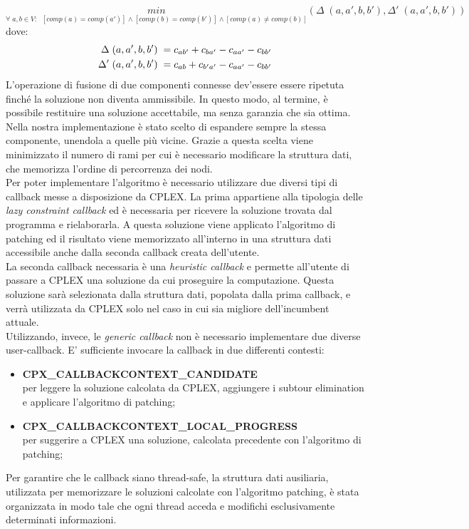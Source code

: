 $$\underset{\forall \; a,b \in V :\;\;[comp(a)=comp(a')] \wedge [comp(b)=comp(b')] \wedge [comp(a)\neq comp(b)]}{min}(\Delta \;(a, a',b, b'), \Delta' \;(a, a', b, b'))$$ dove:
\begin{align}
\Delta \;(a, a',b, b')\;=c_{ab'} + c_{ba'} - c_{aa'} - c_{bb'}\notag\\ 
\Delta' \;(a, a',b, b')\;=c_{ab} + c_{b'a'} - c_{aa'} - c_{bb'}\notag
\end{align}
L'operazione di fusione di due componenti connesse dev'essere essere ripetuta finché la soluzione non diventa ammissibile. In questo modo, al termine, è possibile restituire una soluzione accettabile, ma senza garanzia che sia ottima.\\
Nella nostra implementazione è stato scelto di espandere sempre la stessa componente, unendola a quelle più vicine. Grazie a questa scelta viene minimizzato il numero di rami per cui è necessario modificare la struttura dati, che memorizza l'ordine di percorrenza dei nodi.\\
Per poter implementare l'algoritmo è necessario utilizzare due diversi tipi di callback messe a disposizione da CPLEX. La prima appartiene alla tipologia delle \textit{lazy constraint callback} ed è necessaria per ricevere la soluzione trovata dal programma e rielaborarla. A questa soluzione viene applicato l'algoritmo di patching ed il risultato viene memorizzato all'interno in una struttura dati accessibile anche dalla seconda callback creata dell'utente.\\
La seconda callback necessaria è una \textit{heuristic callback} e permette all'utente di passare a CPLEX una soluzione da cui proseguire la computazione. Questa soluzione sarà selezionata dalla struttura dati, popolata dalla prima callback, e verrà utilizzata da CPLEX solo nel caso in cui sia migliore dell'incumbent attuale.\\
Utilizzando, invece, le \textit{generic callback} non è necessario implementare due diverse user-callback. E' sufficiente invocare la callback in due differenti contesti:
\begin{itemize}
\item{\textbf{CPX\_CALLBACKCONTEXT\_CANDIDATE}\\
per leggere la soluzione calcolata da CPLEX, aggiungere i subtour elimination e applicare l'algoritmo di patching;
}
\item{\textbf{CPX\_CALLBACKCONTEXT\_LOCAL\_PROGRESS}\\
per suggerire a CPLEX una soluzione, calcolata precedente con l'algoritmo di patching;
}
\end{itemize}
Per garantire che le callback siano thread-safe, la struttura dati ausiliaria, utilizzata per memorizzare le soluzioni calcolate con l'algoritmo patching, è stata organizzata in modo tale che ogni thread acceda e modifichi esclusivamente determinati informazioni.\\

